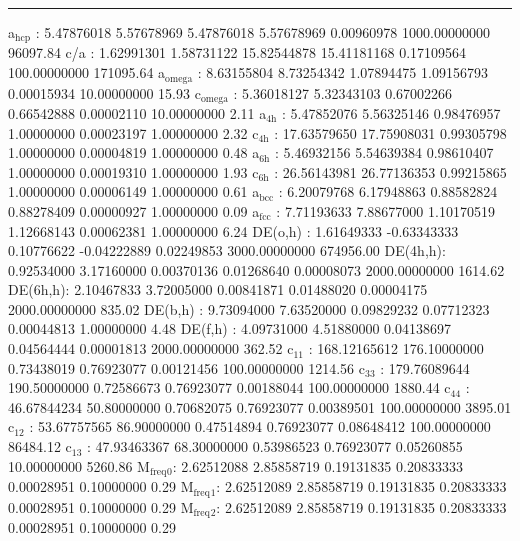 \documentclass[11pt]{article}
\begin{document}
\noindent\rule{\textwidth}{0.5pt}
a\(_{\text{hcp}}\)   :   5.47876018   5.57678969   5.47876018   5.57678969   0.00960978 1000.00000000     96097.84
c/a     :   1.62991301   1.58731122  15.82544878  15.41181168   0.17109564 100.00000000    171095.64
a\(_{\text{omega}}\) :   8.63155804   8.73254342   1.07894475   1.09156793   0.00015934  10.00000000        15.93
c\(_{\text{omega}}\) :   5.36018127   5.32343103   0.67002266   0.66542888   0.00002110  10.00000000         2.11
a\(_{\text{4h}}\)    :   5.47852076   5.56325146   0.98476957   1.00000000   0.00023197   1.00000000         2.32
c\(_{\text{4h}}\)    :  17.63579650  17.75908031   0.99305798   1.00000000   0.00004819   1.00000000         0.48
a\(_{\text{6h}}\)    :   5.46932156   5.54639384   0.98610407   1.00000000   0.00019310   1.00000000         1.93
c\(_{\text{6h}}\)    :  26.56143981  26.77136353   0.99215865   1.00000000   0.00006149   1.00000000         0.61
a\(_{\text{bcc}}\)   :   6.20079768   6.17948863   0.88582824   0.88278409   0.00000927   1.00000000         0.09
a\(_{\text{fcc}}\)   :   7.71193633   7.88677000   1.10170519   1.12668143   0.00062381   1.00000000         6.24
DE(o,h) :   1.61649333  -0.63343333   0.10776622  -0.04222889   0.02249853 3000.00000000    674956.00
DE(4h,h):   0.92534000   3.17160000   0.00370136   0.01268640   0.00008073 2000.00000000      1614.62
DE(6h,h):   2.10467833   3.72005000   0.00841871   0.01488020   0.00004175 2000.00000000       835.02
DE(b,h) :   9.73094000   7.63520000   0.09829232   0.07712323   0.00044813   1.00000000         4.48
DE(f,h) :   4.09731000   4.51880000   0.04138697   0.04564444   0.00001813 2000.00000000       362.52
c\(_{\text{11}}\)    : 168.12165612 176.10000000   0.73438019   0.76923077   0.00121456 100.00000000      1214.56
c\(_{\text{33}}\)    : 179.76089644 190.50000000   0.72586673   0.76923077   0.00188044 100.00000000      1880.44
c\(_{\text{44}}\)    :  46.67844234  50.80000000   0.70682075   0.76923077   0.00389501 100.00000000      3895.01
c\(_{\text{12}}\)    :  53.67757565  86.90000000   0.47514894   0.76923077   0.08648412 100.00000000     86484.12
c\(_{\text{13}}\)    :  47.93463367  68.30000000   0.53986523   0.76923077   0.05260855  10.00000000      5260.86
M\(_{\text{freq}}\)\(_{\text{0}}\):   2.62512088   2.85858719   0.19131835   0.20833333   0.00028951   0.10000000         0.29
M\(_{\text{freq}}\)\(_{\text{1}}\):   2.62512089   2.85858719   0.19131835   0.20833333   0.00028951   0.10000000         0.29
M\(_{\text{freq}}\)\(_{\text{2}}\):   2.62512089   2.85858719   0.19131835   0.20833333   0.00028951   0.10000000         0.29
\end{document}
